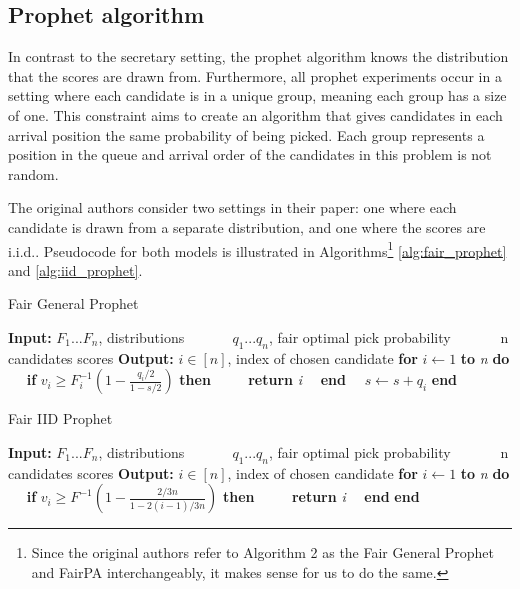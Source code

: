\subsection{Prophet algorithm}
In contrast to the secretary setting, the prophet algorithm knows the distribution that the scores are drawn from. Furthermore, all prophet experiments occur in a setting where each candidate is in a unique group, meaning each group has a size of one. This constraint aims to create an algorithm that gives candidates in each arrival position the same probability of being picked. Each group represents a position in the queue and arrival order of the candidates in this problem is not random. 

The original authors consider two settings in their paper: one where each candidate is drawn from a separate distribution, and one where the scores are i.i.d.. Pseudocode for both models is illustrated in Algorithms\footnote{Since the original authors refer to Algorithm 2  as the Fair General Prophet and FairPA interchangeably, it makes sense for us to do the same.} \ref{alg:fair_prophet} and \ref{alg:iid_prophet}. 

\begin{minipage}[t]{0.46\textwidth}
\begin{algorithm}[H]
    \centering
   \caption{Fair General Prophet}\label{alg:fair_prophet}
\begin{algorithmic}
\State \textbf{Input: }$F_1 ... F_n$, distributions 
\State $\qquad \>\>\>\>\> q_1 ... q_n$, fair optimal pick probability
\State $\qquad \>\>\>\>$ n candidates scores
\State \textbf{Output: }$i \in [n]$, index of chosen candidate
\State \textbf{for} $i \leftarrow 1$ \textbf{to} \textit{n} \textbf{do}
\State $\quad$ \textbf{if} $v_{i} \geq F_{i}^{-1} \left (1 - \frac{q_{i} / 2}{1-s / 2}\right)$ \textbf{then}
\State $\qquad$ \textbf{return} \textit{i}
\State $\quad$\textbf{end}
\State $\quad s \leftarrow s+q_{i}$
\State \textbf{end}
\end{algorithmic}
\end{algorithm}
\end{minipage}
\hfill
\begin{minipage}[t]{0.46\textwidth}
\begin{algorithm}[H]
    \centering
  \caption{Fair IID Prophet}\label{alg:iid_prophet}
\begin{algorithmic}
\State \textbf{Input: }$F_1 ... F_n$, distributions 
\State $\qquad \>\>\>\>\> q_1 ... q_n$, fair optimal pick probability
\State $\qquad \>\>\>\>$ n candidates scores
\State \textbf{Output: }$i \in [n]$, index of chosen candidate
\State \textbf{for} $i \leftarrow 1$ \textbf{to} \textit{n} \textbf{do}
\State $\quad$ \textbf{if} $v_{i} \geq F^{-1}\left(1-\frac{2 / 3 n}{1-2(i-1) / 3 n}\right)$ \textbf{then}
\State $\qquad$ \textbf{return} \textit{i}
\State $\quad$\textbf{end}
\State \textbf{end}
\State
\end{algorithmic}
\end{algorithm}
\end{minipage}

